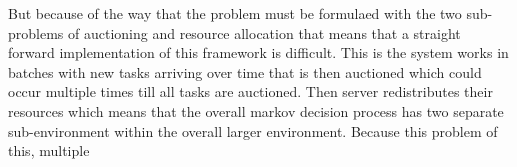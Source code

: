 But because of the way that the problem must be formulaed with the two sub-problems of auctioning and resource
allocation that means that a straight forward implementation of this framework is difficult. This is the system works
in batches with new tasks arriving over time that is then auctioned which could occur multiple times till all tasks
are auctioned. Then server redistributes their resources which means that the overall markov decision process has
two separate sub-environment within the overall larger environment. Because this problem of this, multiple